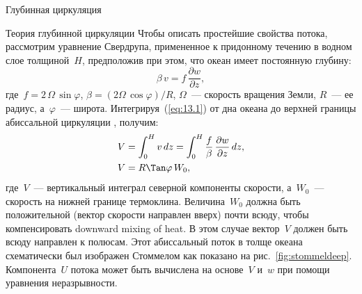 \begin{chapter}{Глубинная циркуляция}
\begin{section}{Теория глубинной циркуляции}
Чтобы описать простейшие свойства потока, рассмотрим уравнение Свердрупа,
примененное к придонному течению в водном слое толщиной~$H$, предположив
при этом, что океан имеет постоянную глубину:
\begin{equation}\label{eq:13.1}
 \beta\,v =f\,\frac{\partial{w}}{\partial{z}},
\end{equation}
где~$f =2\,\Omega\,\sin \varphi$, 
$\beta = \left(2\Omega\,\cos \varphi \right)/{R}$, $\Omega$~--- скорость
вращения Земли, $R$~--- ее радиус, а~$\varphi$~--- широта. 
Интегрируя~(\ref{eq:13.1}) от дна океана до верхней границы абиссальной 
циркуляции%
, получим:
\begin{align}
  V &= \int_{0}^{H} v\,dz = \int_{0}^{H}
       \frac{f}{\beta}\,\frac{\partial{w}}{\partial{z}}\,dz, \notag \\
  V &= R \Tan \varphi \,W_0,\label{eq:13.2}
\end{align}
где~$V$~--- вертикальный интеграл северной компоненты скорости, 
а~$W_0$~--- скорость на нижней границе 
термоклина. 
Величина~$W_0$ должна быть положительной (вектор скорости направлен вверх) 
почти всюду, чтобы компенсировать downward mixing 
of heat. В этом случае вектор~$V$ должен быть всюду направлен к полюсам.
Этот абиссальный поток в толще океана схематически был изображен Стоммелом
как показано на рис.~\ref{fig:stommeldeep}. Компонента~$U$ потока может быть
вычислена на основе~$V$ и~$w$ при помощи уравнения неразрывности.
%


\end{section}
\end{chapter}

